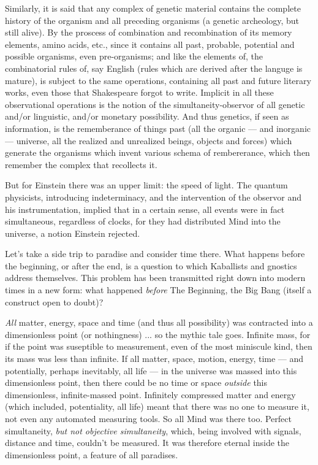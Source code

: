 Similarly, it is said that any complex of genetic material contains the complete history of the organism and all preceding organisms (a genetic archeology, but still alive). By the proscess of combination and recombination of its memory elements, amino acids, etc., since it contains all past, probable, potential and possible organisms, even pre-organisms; and like the elements of, the combinatorial rules of, say English (rules which are derived after the languge is mature), is subject to the same operations, containing all past and future literary works, even those that Shakespeare forgot to write. Implicit in all these observational operations is the notion of the simultaneity-observor of all genetic and\slash or linguistic, and\slash or monetary possibility. And thus genetics, if seen as information, is the rememberance of things past (all the organic --- and inorganic --- universe, all the realized and unrealized beings, objects and forces) which generate the organisms which invent various schema of rembererance, which then remember the complex that recollects it.

But for Einstein there was an upper limit: the speed of light. The quantum physicists, introducing indeterminacy, and the intervention of the observor and his instrumentation, implied that in a certain sense, all events were in fact simultaneous, regardless of clocks, for they had distributed Mind into the universe, a notion Einstein rejected.

Let's take a side trip to paradise and consider time there. What happens before the beginning, or after the end, is a question to which Kaballists and gnostics address themselves. This problem has been transmitted right down into modern times in a new form: what happened \emph{before} The Beginning, the Big Bang (itself a construct open to doubt)?

\emph{All} matter, energy, space and time (and thus all possibility) was contracted into a dimensionless point (or nothingness) ... so the mythic tale goes. Infinite mass, for if the point was suseptible to measurement, even of the most miniscule kind, then its mass was less than infinite. If all matter, space, motion, energy, time --- and potentially, perhaps inevitably, all life --- in the universe was massed into this dimensionless point, then there could be no time or space \emph{outside} this dimensionless, infinite-massed point. Infinitely compressed matter and energy (which included, potentiality, all life) meant that there was no one to measure it, not even any automated measuring tools. So all Mind was there too. Perfect simultaneity, \emph{but not objective simultaneity}, which, being involved with signals, distance and time, couldn't be measured. It was therefore eternal inside the dimensionless point, a feature of all paradises.

